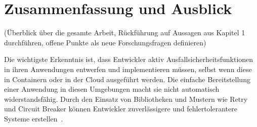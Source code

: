 \section{Zusammenfassung und Ausblick}

(Überblick über die gesamte Arbeit, Rückführung auf Aussagen aus Kapitel 1 durchführen, offene Punkte als neue Forschungsfragen definieren)

Die wichtigste Erkenntnis ist, dass Entwickler aktiv Ausfallsicherheitsfunktionen
in ihren Anwendungen entwerfen und implementieren müssen, selbst wenn diese in Containern oder in der Cloud ausgeführt werden.
Die einfache Bereitstellung einer Anwendung in diesen Umgebungen macht sie nicht automatisch widerstandsfähig.
Durch den Einsatz von Bibliotheken und Mustern wie Retry und Circuit Breaker können Entwickler zuverlässigere und
fehlertolerantere Systeme erstellen~\cite{Haley.28.06.2018}.
